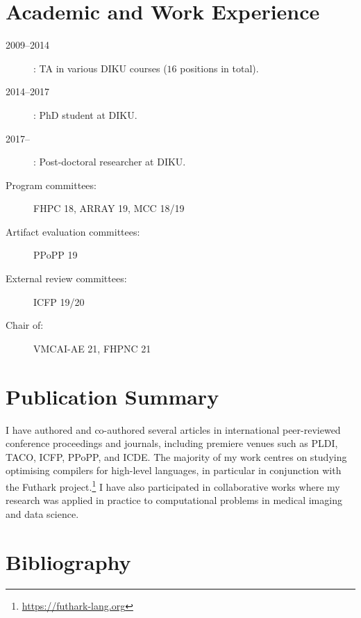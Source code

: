 \documentclass{resume} %
\begin{document}
\section{Academic and Work Experience}

\begin{description}
\item[2009--2014]: TA in various DIKU courses ($16$ positions in total).
\item[2014--2017]: PhD student at DIKU.
\item[2017--]: Post-doctoral researcher at DIKU.
\end{description}

\begin{description}
\item[Program committees:] FHPC 18, ARRAY 19, MCC 18/19
\item[Artifact evaluation committees:] PPoPP 19
\item[External review committees:] ICFP 19/20
\item[Chair of:] VMCAI-AE 21, FHPNC 21
\end{description}

\section{Publication Summary}

I have authored and co-authored several articles in international
peer-reviewed conference proceedings and journals, including premiere
venues such as PLDI, TACO, ICFP, PPoPP, and ICDE.  The majority of my
work centres on studying optimising compilers for high-level
languages, in particular in conjunction with the Futhark
project.\footnote{\url{https://futhark-lang.org}} I have also
participated in collaborative works where my research was applied in
practice to computational problems in medical imaging and data
science.

\newpage

\section{Bibliography}

\nocite{*}


\end{document}
